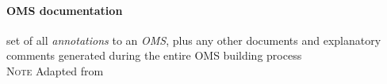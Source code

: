 \documentclass[10pt,%
\ifpretendfinal
final%
\else
draft%
\fi,
]{scrreprt}
\makeatletter
\newcommand*\CommentAuthor{}
\renewcommand*\CommentAuthor{#1}}
\newcommand*\CommentDate{}
\renewcommand*\CommentDate{#1}}
\newcommand*\CommentId{}
\renewcommand*\CommentId{#1}}
\newcommand*\CommentType{}
\renewcommand*\CommentType{#1}}
\newcommand*{\SetCommentColorByType}[1]{%
\edef\localType{{#1}}%
\expandafter\ifstrequal\localType{q-aut}{\colorlet{CommentColor}{red}}{%
\expandafter\ifstrequal\localType{q-all}{\colorlet{CommentColor}{orange}}{%
\expandafter\ifstrequal\localType{todo}{\colorlet{CommentColor}{orange}}{%
\expandafter\ifstrequal\localType{fyi}{\colorlet{CommentColor}{lightgray}}{%
\colorlet{CommentColor}{yellow}}}}}}
\newcommand*{\SetCommentPrefixByType}[1]{%
\edef\localType{{#1}}%
\expandafter\@ifmtarg\localType{%
\edef\CommentPrefix{}%
}{%
\caseupper[q]{#1}%
\edef\CommentPrefix{\thestring: }%
}}
\newcommand*{\initComment}[1]{%
\setkeys{Comment}{#1}%
\SetCommentColorByType{\CommentType}%
\relax%
\SetCommentPrefixByType{\CommentType}%
\relax%
}
\newcommand*{\todonote}[2][]{%
\initComment{#1}%
\pdfcomment[author=\CommentAuthor,color=CommentColor,date=\CommentDate,id=\CommentId]{%
\CommentPrefix
#2}}
\renewcommand*{\todonote}[2][]{%
\initComment{#1}%
\ednote{\CommentPrefix #2}}
\newcommand*{\termref}[1]{\textit{#1}}
\newcommand{\termdefinition}[2]{\paragraph{#1} #2}
\newcommand{\nisref}[1]{#1}
\newenvironment{definitions}[0]{\medskip }{}
\newenvironment{note}[0]{\ \\ \textsc{Note} \quad}{}
\makeatother
\begin{document}
\begin{definitions}
  
  
  
 

  \termdefinition{OMS documentation}{set of all \termref{annotations} to an \termref{OMS}, plus any other documents and explanatory comments generated during the entire OMS building process}
  \begin{note}
    Adapted from \cite{SuarezFigueroaEtAl:OntologyGlossary2008}
  \end{note}
\end{definitions}
\end{document}
